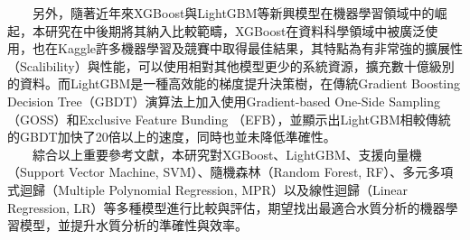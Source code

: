 \documentclass[12pt,a4paper]{article}
\begin{document}
\begin{enumerate}
\begin{enumerate}[label=\arabic*.]
　　另外，隨著近年來XGBoost與LightGBM等新興模型在機器學習領域中的崛起，本研究在中後期將其納入比較範疇，XGBoost在資料科學領域中被廣泛使用，也在Kaggle許多機器學習及競賽中取得最佳結果，其特點為有非常強的擴展性（Scalibility）與性能，可以使用相對其他模型更少的系統資源，擴充數十億級別的資料\cite{ref9}。而LightGBM是一種高效能的梯度提升決策樹，在傳統Gradient Boosting Decision Tree（GBDT）演算法上加入使用Gradient-based One-Side Sampling（GOSS）和Exclusive Feature Bunding （EFB），並顯示出LightGBM相較傳統的GBDT加快了20倍以上的速度，同時也並未降低準確性\cite{ref10}。\\
　　綜合以上重要參考文獻，本研究對XGBoost、LightGBM、支援向量機（Support Vector Machine, SVM）、隨機森林（Random Forest, RF）、多元多項式迴歸（Multiple Polynomial Regression, MPR）以及線性迴歸（Linear Regression, LR）等多種模型進行比較與評估，期望找出最適合水質分析的機器學習模型，並提升水質分析的準確性與效率。
\end{enumerate}


\end{enumerate}
\end{document}
